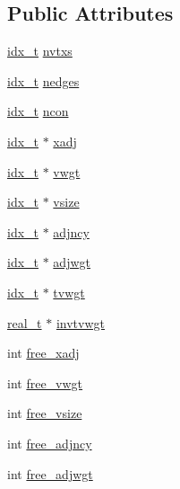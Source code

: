 \subsection*{Public Attributes}
\begin{DoxyCompactItemize}
\item 
\hyperlink{a00876_aaa5262be3e700770163401acb0150f52}{idx\+\_\+t} \hyperlink{a00734_a7e70f7ea557eaa17352b8068c8cb5f03}{nvtxs}
\item 
\hyperlink{a00876_aaa5262be3e700770163401acb0150f52}{idx\+\_\+t} \hyperlink{a00734_a0dcab67cfc75a9d7bc3cab2563f4df03}{nedges}
\item 
\hyperlink{a00876_aaa5262be3e700770163401acb0150f52}{idx\+\_\+t} \hyperlink{a00734_acdfe382784cfe19f41fb10ede3a5a9f9}{ncon}
\item 
\hyperlink{a00876_aaa5262be3e700770163401acb0150f52}{idx\+\_\+t} $\ast$ \hyperlink{a00734_aa92b073425f4bca4789af4cf33a547e5}{xadj}
\item 
\hyperlink{a00876_aaa5262be3e700770163401acb0150f52}{idx\+\_\+t} $\ast$ \hyperlink{a00734_a3a94894dcbf1b65a638e37cd485b5f88}{vwgt}
\item 
\hyperlink{a00876_aaa5262be3e700770163401acb0150f52}{idx\+\_\+t} $\ast$ \hyperlink{a00734_ad191f54e22012bbc3c7cc5fec228c71a}{vsize}
\item 
\hyperlink{a00876_aaa5262be3e700770163401acb0150f52}{idx\+\_\+t} $\ast$ \hyperlink{a00734_a0301c5a80081df93c122992f779ded24}{adjncy}
\item 
\hyperlink{a00876_aaa5262be3e700770163401acb0150f52}{idx\+\_\+t} $\ast$ \hyperlink{a00734_acad756362a4703fefde4e7cbca8f46f8}{adjwgt}
\item 
\hyperlink{a00876_aaa5262be3e700770163401acb0150f52}{idx\+\_\+t} $\ast$ \hyperlink{a00734_ace9ad621f1e97e5a796c8d24a345aef8}{tvwgt}
\item 
\hyperlink{a00876_a1924a4f6907cc3833213aba1f07fcbe9}{real\+\_\+t} $\ast$ \hyperlink{a00734_a25c1b2aeb241430033fb752ba11b5cbb}{invtvwgt}
\item 
int \hyperlink{a00734_a3e30bc414d99cbb3c619a0575bd542f3}{free\+\_\+xadj}
\item 
int \hyperlink{a00734_a4573225a35a1b8e4e5c90f6b26ab3082}{free\+\_\+vwgt}
\item 
int \hyperlink{a00734_ac4526f6e81ac9d349bf1c69eb6359a85}{free\+\_\+vsize}
\item 
int \hyperlink{a00734_afaa9c1b1b1fd7238b724d9f030f582cd}{free\+\_\+adjncy}
\item 
int \hyperlink{a00734_a2ff72cc1f2462e073d9293a558d3d944}{free\+\_\+adjwgt}

\end{DoxyCompactItemize}

